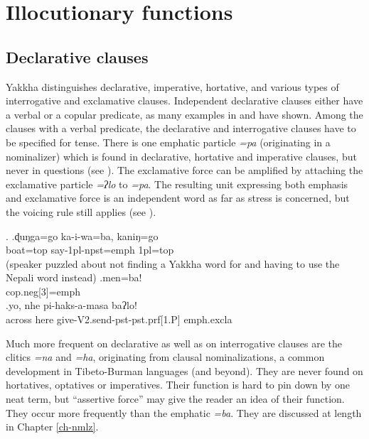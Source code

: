 \section{Illocutionary functions}\label{simp-cl3}
 

\subsection{Declarative clauses }
 Yakkha distinguishes declarative, imperative, hortative, and various types of interrogative and exclamative clauses.
 Independent declarative clauses either have a verbal or a copular predicate, as many examples in   and  have shown. Among the clauses with a verbal predicate, the declarative and interrogative clauses have to be specified for tense. There is one emphatic particle \emph{=pa} (originating in a nominalizer) which is found in declarative, hortative and  imperative clauses, but never in questions (see \Next). The exclamative force can be amplified by attaching the exclamative particle \emph{=ʔlo} to \emph{=pa}. The resulting unit expressing both emphasis and exclamative force is an independent word as far as stress is concerned, but the voicing rule still applies (see \Next[c]). 
 
 \ex. \ag.ɖuŋga=go     ka-i-wa=ba,               kaniŋ=go\\
 boat{\sc =top} say{\sc -1pl-npst=emph} {\sc 1pl=top}\\
  (speaker puzzled about not finding a Yakkha word for  and having to use the Nepali word instead) 
 \bg.men=ba!\\
 {\sc cop.neg[3]=emph}\\
 \bg.yo,   nhe  pi-haks-a-masa       baʔlo!\\
 across here give{\sc -V2.send-pst-pst.prf[1.P]} {\sc emph.excla}\\
  
 
Much more frequent on declarative as well as on interrogative clauses are the clitics \emph{=na} and \emph{=ha}, originating from clausal nominalizations, a common development in Tibeto-Burman languages (and beyond). They are never found on hortatives, optatives or imperatives. Their function is hard to pin down by one neat term, but “assertive force” may give the reader an idea of their function. They occur more frequently than the emphatic \emph{=ba}. They are discussed at length in Chapter \ref{ch-nmlz}. 

